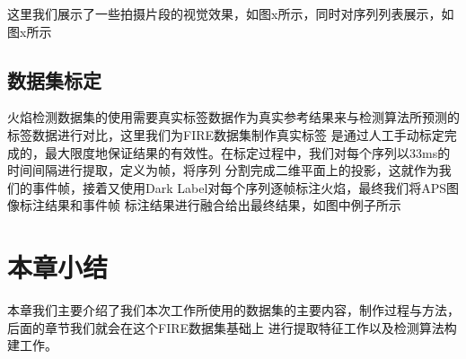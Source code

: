 这里我们展示了一些拍摄片段的视觉效果，如图x所示，同时对序列列表展示，如图x所示

\subsection{数据集标定}
火焰检测数据集的使用需要真实标签数据作为真实参考结果来与检测算法所预测的标签数据进行对比，这里我们为FIRE数据集制作真实标签
是通过人工手动标定完成的，最大限度地保证结果的有效性。在标定过程中，我们对每个序列以33ms的时间间隔进行提取，定义为帧，将序列
分割完成二维平面上的投影，这就作为我们的事件帧，接着又使用Dark Label对每个序列逐帧标注火焰，最终我们将APS图像标注结果和事件帧
标注结果进行融合给出最终结果，如图中例子所示

\section{本章小结}
本章我们主要介绍了我们本次工作所使用的数据集的主要内容，制作过程与方法，后面的章节我们就会在这个FIRE数据集基础上
进行提取特征工作以及检测算法构建工作。